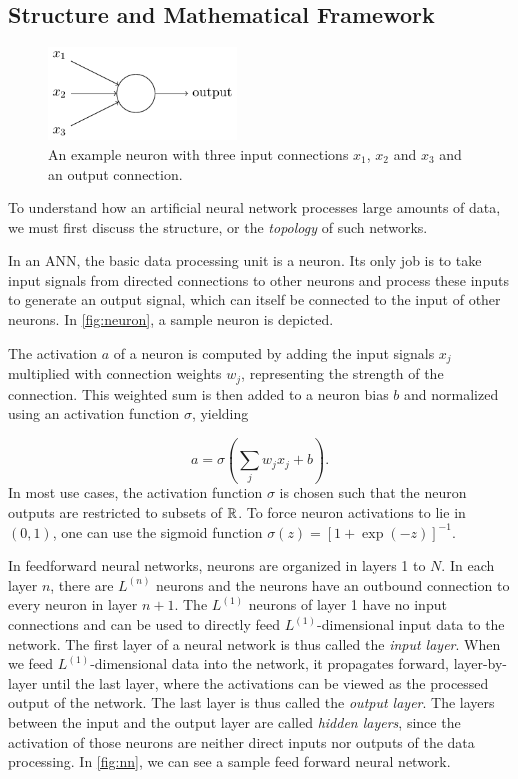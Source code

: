 \subsection{Structure and Mathematical Framework}

\begin{figure}
  \includegraphics[width=5cm]{media/neuron.png}
  \caption{
    An example neuron with three input connections $x_1$, $x_2$ and
    $x_3$ and an output connection. \cite{nielsen}
  }
  \label{fig:neuron}
\end{figure}
To understand how an artificial neural network processes large amounts of data,
we must first discuss the structure, or the \textit{topology} of such networks.

In an ANN, the basic data processing unit is a neuron. Its only job is to take
input signals from directed connections to other neurons and process these inputs to generate an output signal, which can itself be connected to the input of other neurons. In \autoref{fig:neuron}, a sample neuron is depicted.

The activation $a$ of a neuron is computed by adding the input signals $x_j$ multiplied with connection weights $w_j$, representing the strength of the connection. This weighted sum is then added to a neuron bias $b$ and normalized using an activation function $\sigma$, yielding

\begin{equation}
  a = \sigma\left(\sum_j w_j x_j + b\right).
\end{equation}
In most use cases, the activation function $\sigma$ is chosen such that the
neuron outputs are restricted to subsets of $\mathbb{R}$. To force neuron activations
to lie in $(0,1)$, one can use the sigmoid function
$\sigma(z) = [1+\exp(-z)]^{-1}$.

In feedforward neural networks, neurons are organized in layers 1 to $N$.
In each layer $n$, there are $L^{(n)}$ neurons and the neurons have an outbound connection to every neuron in layer $n+1$.
The $L^{(1)}$ neurons of layer 1 have no input connections and can be used to directly feed $L^{(1)}$-dimensional input data to the network.
The first layer of a neural network is thus called the \textit{input layer}.
When we feed $L^{(1)}$-dimensional data into the network, it propagates forward, layer-by-layer until the last layer, where the activations can be viewed as the processed output of the network. The last layer is thus called the \textit{output layer}.
The layers between the input and the output layer are called \textit{hidden layers}, since the activation of those neurons are neither direct inputs nor outputs of the data processing. In \autoref{fig:nn}, we can see a sample feed forward neural network.

